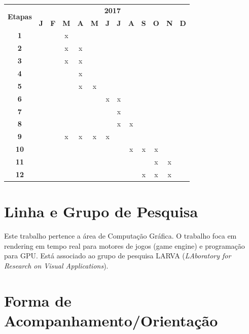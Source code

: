 \documentclass[11pt]{article}
\begin{document}
\vspace{0.5cm}
{\tiny
\noindent \begin{tabular}{|c||c|c|c|c|c|c|c|c|c|c|c|c|}
  \hline
  \multirow{2}{*}{\textbf{\small{Etapas}}} & \multicolumn{12}{|c||}{\textbf{\small{2017}}} \\
  \cline{2-13}
   & \textbf{J} & \textbf{F} & \textbf{M} & \textbf{A} & \textbf{M} & \textbf{J} & \textbf{J} & \textbf{A} & \textbf{S} & \textbf{O} & \textbf{N} & \textbf{D} \\
  \hline
  \hline
    \textbf{\small{1}} & & & x & & & & & & & & & \\
  \hline
    \textbf{\small{2}} & & & x & x & & & &  &  & & & \\
  \hline
    \textbf{\small{3}} & & & x & x & & & & & & & & \\
  \hline
    \textbf{\small{4}} & & & & x & & & & & & & & \\
  \hline
    \textbf{\small{5}} & & & & x & x & & & & & & & \\
  \hline
    \textbf{\small{6}} & & & & & & x & x & & & & & \\
  \hline
    \textbf{\small{7}} & & & & & & & x & & & & & \\
  \hline
    \textbf{\small{8}} & & & & & & & x & x & & & & \\
  \hline
    \textbf{\small{9}} & & & x & x & x & x & & & & & & \\
  \hline
    \textbf{\small{10}} & & & & & & & & x & x & x & & \\
  \hline
    \textbf{\small{11}} & & & & & & & & & & x & x & \\
  \hline
    \textbf{\small{12}} & & & & & & & & & x & x & x & \\
  \hline
\end{tabular}
}


\section{Linha e Grupo de Pesquisa}

Este trabalho pertence a área de Computação Gráfica. O trabalho foca
em rendering em tempo real para motores de jogos (game engine) e
programação para GPU. Está associado ao grupo de pesquisa LARVA
(\textit{LAboratory for Research on Visual Applications}).

\section{Forma de Acompanhamento/Orientação}
\end{document}
